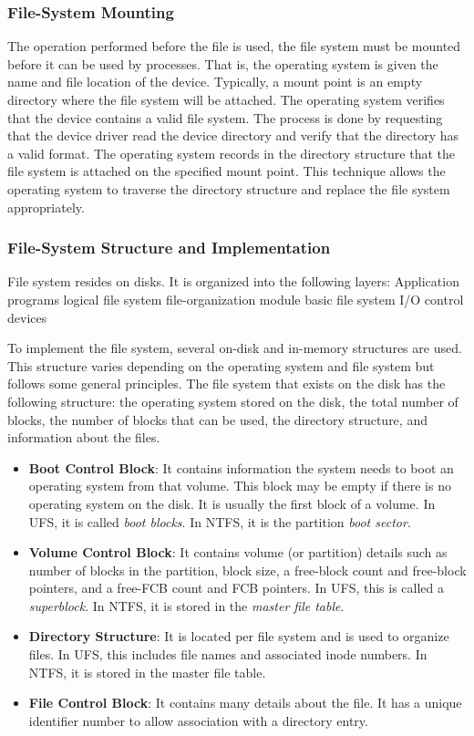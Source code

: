 \documentclass{homework}
\begin{document}
\subsubsection{File-System Mounting}
The operation performed before the file is used, the file system must be mounted before it can be used by processes. That is, the operating system is given the name and file location of the device. Typically, a mount point is an empty directory where the file system will be attached. The operating system verifies that the device contains a valid file system. The process is done by requesting that the device driver read the device directory and verify that the directory has a valid format. The operating system records in the directory structure that the file system is attached on the specified mount point. This technique allows the operating system to traverse the directory structure and replace the file system appropriately.

\subsubsection{File-System Structure and Implementation}
File system resides on disks. It is organized into the following layers: 
Application programs \rightarrow logical file system \rightarrow file-organization module \rightarrow basic file system \rightarrow I/O control \rightarrow devices

To implement the file system, several on-disk and in-memory structures are used. This structure varies depending on the operating system and file system but follows some general principles. The file system that exists on the disk has the following structure: the operating system stored on the disk, the total number of blocks, the number of blocks that can be used, the directory structure, and information about the files.
\begin{itemize}
    \item \textbf{Boot Control Block}: It contains information the system needs to boot an operating system from that volume. This block may be empty if there is no operating system on the disk. It is usually the first block of a volume. In UFS, it is called \textit{boot blocks}. In NTFS, it is the partition \textit{boot sector}.
    \item \textbf{Volume Control Block}: It contains volume (or partition) details such as number of blocks in the partition, block size, a free-block count and free-block pointers, and a free-FCB count and FCB pointers. In UFS, this is called a \textit{superblock}. In NTFS, it is stored in the \textit{master file table}.
    \item \textbf{Directory Structure}: It is located per file system and is used to organize files. In UFS, this includes file names and associated inode numbers. In NTFS, it is stored in the master file table.
    \item \textbf{File Control Block}: It contains many details about the file. It has a unique identifier number to allow association with a directory entry.
\end{itemize}
\end{document}

